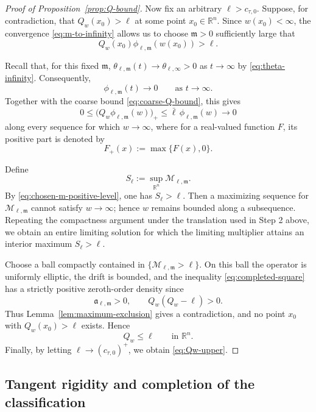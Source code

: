 \documentclass[reqno,12pt]{amsart}
\numberwithin{equation}{section}
\theoremstyle{remark}
\newcommand{\R}{\mathbb R}
\begin{document}
\begin{proof}[Proof of Proposition~\ref{prop:Q-bound}]
\medskip
{}
Now fix an arbitrary $\ell>c_{\tau,0}$.
Suppose, for contradiction, that $Q_w(x_0)>\ell$ at some point $x_0\in\R^n$.
Since $w(x_0)<\infty$, the convergence \eqref{eq:m-to-infinity} allows us to choose $\mathfrak m>0$ sufficiently large that
\begin{equation}\label{eq:chosen-m-positive-level}
Q_w(x_0) \phi_{\ell,\mathfrak m}(w(x_0)) >\ell.
\end{equation}

Recall that, for this fixed $\mathfrak m$,
$\theta_{\ell,\mathfrak m}(t)\to\theta_{\ell,\infty}>0$
as $t\to\infty$ by \eqref{eq:theta-infinity}.
Consequently,
$$
\phi_{\ell,\mathfrak m}(t)\to 0  \qquad\text{as }t\to\infty.
$$
Together with the coarse bound \eqref{eq:coarse-Q-bound}, this gives
$$
0\le \bigl( Q_w\phi_{\ell,\mathfrak m}(w) \bigr)_+ \le  \bar\ell\, \phi_{\ell,\mathfrak m}(w) \to 0
$$
along every sequence for which $w\to\infty$, where for a real-valued function $F$, its positive part is denoted by
$$
    F_+(x):=\max\{F(x),0\}.
$$

Define
$$
S_\ell:=\sup_{\R^n} \mathscr M_{\ell,\mathfrak m}.
$$
By \eqref{eq:chosen-m-positive-level}, one has $S_\ell >\ell$.
Then a maximizing sequence for
$\mathscr M_{\ell,\mathfrak m}$ cannot satisfy $w\to\infty$;
hence $w$ remains bounded along a subsequence.
Repeating the  compactness argument under the translation used in  Step 2 above, we obtain an entire limiting solution for which the limiting multiplier attains an interior maximum $S_\ell>\ell$.

Choose a ball compactly contained in $\{\mathscr M_{\ell,\mathfrak m}>\ell\}$.
On this ball the operator is uniformly elliptic, the drift is bounded, and the  inequality \eqref{eq:completed-square} has a strictly positive zeroth-order density since
$$
\mathfrak a_{\ell,\mathfrak m}>0, \qquad Q_w(Q_w-\ell)>0.
$$
Thus Lemma~\ref{lem:maximum-exclusion} gives a contradiction, and  no point $x_0$ with $Q_w(x_0)>\ell$ exists. Hence
$$   Q_w\le\ell   \qquad\text{in }\R^n.$$
Finally, by letting $\ell\to (c_{\tau,0})^+$, we obtain \eqref{eq:Qw-upper}.
\end{proof}


\subsection{Tangent rigidity and completion of the  classification}\label{sec:classification-end}
\end{document}
